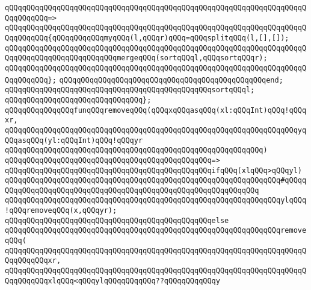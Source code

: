 \verb|qQQqqQQqqQQqqQQqqQQqqQQqqQQqqQQqqQQqqQQqqQQqqQQqqQQqqQQqqQQqqQQqqQQqqQQqqQQqqQQq=>|\newline
\verb|qQQqqQQqqQQqqQQqqQQqqQQqqQQqqQQqqQQqqQQqqQQqqQQqqQQqqQQqqQQqqQQqqQQqqQQqqQQqqQQq{qQQqqQQqqQQqmyqQQq(l,qQQqr)qQQq=qQQqsplitqQQq(l,[],[]);|\newline
\verb|qQQqqQQqqQQqqQQqqQQqqQQqqQQqqQQqqQQqqQQqqQQqqQQqqQQqqQQqqQQqqQQqqQQqqQQqqQQqqQQqqQQqqQQqqQQqqQQqmergeqQQq(sortqQQql,qQQqsortqQQqr);|\newline
\verb|qQQqqQQqqQQqqQQqqQQqqQQqqQQqqQQqqQQqqQQqqQQqqQQqqQQqqQQqqQQqqQQqqQQqqQQqqQQqqQQq};|\newline
\verb|qQQqqQQqqQQqqQQqqQQqqQQqqQQqqQQqqQQqqQQqqQQqqQQqend;|\newline
\newline
\verb|qQQqqQQqqQQqqQQqqQQqqQQqqQQqqQQqqQQqqQQqqQQqqQQqsortqQQql;|\newline
\verb|qQQqqQQqqQQqqQQqqQQqqQQqqQQqqQQq};|\newline
\newline
\newline
\verb|qQQqqQQqqQQqqQQqfunqQQqremoveqQQq(qQQqxqQQqasqQQq(xl:qQQqInt)qQQq!qQQqxr,|\newline
\verb|qQQqqQQqqQQqqQQqqQQqqQQqqQQqqQQqqQQqqQQqqQQqqQQqqQQqqQQqqQQqqQQqqQQqyqQQqasqQQq(yl:qQQqInt)qQQq!qQQqyr|\newline
\verb|qQQqqQQqqQQqqQQqqQQqqQQqqQQqqQQqqQQqqQQqqQQqqQQqqQQqqQQqqQQq)|\newline
\verb|qQQqqQQqqQQqqQQqqQQqqQQqqQQqqQQqqQQqqQQqqQQqqQQq=>|\newline
\verb|qQQqqQQqqQQqqQQqqQQqqQQqqQQqqQQqqQQqqQQqqQQqqQQqifqQQq(xlqQQq>qQQqyl)|\newline
\verb|qQQqqQQqqQQqqQQqqQQqqQQqqQQqqQQqqQQqqQQqqQQqqQQqqQQqqQQqqQQqqQQq#qQQqqQQqqQQqqQQqqQQqqQQqqQQqqQQqqQQqqQQqqQQqqQQqqQQqqQQqqQQqqQQq|\newline
\verb|qQQqqQQqqQQqqQQqqQQqqQQqqQQqqQQqqQQqqQQqqQQqqQQqqQQqqQQqqQQqqQQqylqQQq!qQQqremoveqQQq(x,qQQqyr);|\newline
\verb|qQQqqQQqqQQqqQQqqQQqqQQqqQQqqQQqqQQqqQQqqQQqqQQqelse|\newline
\verb|qQQqqQQqqQQqqQQqqQQqqQQqqQQqqQQqqQQqqQQqqQQqqQQqqQQqqQQqqQQqqQQqremoveqQQq(|\newline
\verb|qQQqqQQqqQQqqQQqqQQqqQQqqQQqqQQqqQQqqQQqqQQqqQQqqQQqqQQqqQQqqQQqqQQqqQQqqQQqqQQqxr,|\newline
\verb|qQQqqQQqqQQqqQQqqQQqqQQqqQQqqQQqqQQqqQQqqQQqqQQqqQQqqQQqqQQqqQQqqQQqqQQqqQQqqQQqxlqQQq<qQQqylqQQqqQQqqQQq??qQQqqQQqqQQqy|\newline
